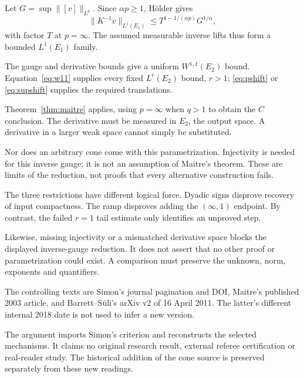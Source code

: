 \documentclass[12pt,reqno]{amsart}
\begin{document}
Let $G=\sup\|[v]\|_{L^p}$. Since $\alpha p\ge1$, H\"older gives
\begin{equation}\label{eq:lift}
\|K^{-1}v\|_{L^1(E_1)}\le T^{1-1/(\alpha p)}G^{1/\alpha},
\end{equation}
with factor $T$ at $p=\infty$. The assumed measurable inverse lifts thus form a bounded $L^1(E_1)$ family.

The gauge and derivative bounds give a uniform $W^{1,1}(E_2)$ bound. Equation~\eqref{eq:w11} supplies every fixed $L^r(E_2)$ bound, $r>1$; \eqref{eq:pshift} or \eqref{eq:supshift} supplies the required translations.

Theorem~\ref{thm:maitre} applies, using $p=\infty$ when $q>1$ to obtain the $C$ conclusion. The derivative must be measured in $E_2$, the output space. A derivative in a larger weak space cannot simply be substituted.

Nor does an arbitrary cone come with this parametrization. Injectivity is needed for this inverse gauge; it is not an assumption of Maitre's theorem. These are limits of the reduction, not proofs that every alternative construction fails.

The three restrictions have different logical force. Dyadic signs disprove recovery of input compactness. The ramp disproves adding the $(\infty,1)$ endpoint. By contrast, the failed $r=1$ tail estimate only identifies an unproved step.

Likewise, missing injectivity or a mismatched derivative space blocks the displayed inverse-gauge reduction. It does not assert that no other proof or parametrization could exist. A comparison must preserve the unknown, norm, exponents and quantifiers.

The controlling texts are Simon's journal pagination and DOI, Maitre's published 2003 article, and Barrett--S\"uli's arXiv v2 of 16 April 2011. The latter's different internal 2018 date is not used to infer a new version.

The argument imports Simon's criterion and reconstructs the selected mechanisms. It claims no original research result, external referee certification or real-reader study. The historical addition of the cone source is preserved separately from these new readings.



\end{document}
